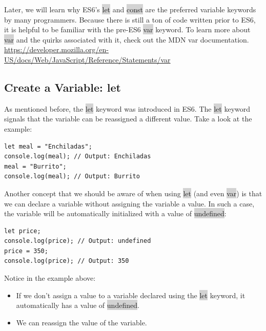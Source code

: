 \documentclass[11pt]{article}
\begin{document}
Later, we will learn why ES6’s \colorbox{lightgray}{let} and \colorbox{lightgray}{const} are the preferred variable keywords by many programmers. Because there is still a ton of code written prior to ES6, it is helpful to be familiar with the pre-ES6 \colorbox{lightgray}{var} keyword. To learn more about \colorbox{lightgray}{var} and the quirks associated with it, check out the MDN var documentation. \\
\underline{https://developer.mozilla.org/en-US/docs/Web/JavaScript/Reference/Statements/var}

\subsection{Create a Variable: let}
As mentioned before, the \colorbox{lightgray}{let} keyword was introduced in ES6. The \colorbox{lightgray}{let} keyword signals that the variable can be reassigned a different value. Take a look at the example: 
\begin{lstlisting}
let meal = "Enchiladas";
console.log(meal); // Output: Enchiladas
meal = "Burrito";
console.log(meal); // Output: Burrito
\end{lstlisting}
Another concept that we should be aware of when using \colorbox{lightgray}{let} (and even \colorbox{lightgray}{var}) is that we can declare a variable without assigning the variable a value. In such a case, the variable will be automatically initialized with a value of \colorbox{lightgray}{undefined}:
\begin{lstlisting}
let price;
console.log(price); // Output: undefined
price = 350;
console.log(price); // Output: 350
\end{lstlisting}
Notice in the example above: 
\begin{itemize}[leftmargin = *]
\item If we don’t assign a value to a variable declared using the \colorbox{lightgray}{let} keyword, it automatically has a value of \colorbox{lightgray}{undefined}.
\item We can reassign the value of the variable.
\end{itemize}
\end{document}
